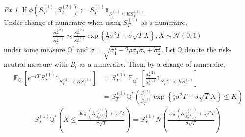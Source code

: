 \documentclass[10pt,landscape, a4paper]{article}
\theoremstyle{remark}
\newtheorem*{Ex}{Ex}
\newcommand{\E}{\operatorname{\mathbb{E}}}
\newcommand{\Q}{\mathbb{Q}}
\begin{document}
\begin{multicols*}{3}
\begin{Ex}
If $\phi (S^{(1)}_T, S^{(2)}_T) := S^{(1)}_T \mathds{1}_{S^{(1)}_T \leq KS^{(1)}_T}$,\\
Under change of numeraire when using $S^{(1)}_T$ as a numeraire, 
\begin{align*}
    \frac{S^{(2)}_T}{S^{(1)}_T} \sim \frac{S^{(2)}_T}{S^{(1)}_T} \exp \left\{\frac{1}{2}\sigma^2 T + \sigma \sqrt{T}X \right\}, X \sim \mathcal{N}(0, 1)
\end{align*}
under some measure $\Q^*$ and $\sigma = \sqrt{\sigma_1^2 - 2\rho \sigma_1 \sigma_2 + \sigma^2_2}$. Let $\Q$ denote the risk-neutral measure with $B_t$ as a numeraire. Then, by a change of numeraire,
\begin{align*}
    \E_{\Q} \left[e^{-rT}S^{(1)}_T \mathds{1}_{S^{(2)}_T < K S^{(1)}_T} \right] &= S^{(1)}_T \E_{\Q^*} \left[\frac{S^{(2)}_T}{S^{(1)}_T} \mathds{1}_{S^{(2)}_T < K S^{(1)}_T} \right]\\
    &=S^{(1)}_T \Q^* \left(\frac{S^{(2)}_T}{S^{(1)}_T} \exp \left\{\frac{1}{2}\sigma^2 T + \sigma \sqrt{T}X \right\} \leq K \right)
\end{align*}
\begin{align*}
    S^{(1)}_T \Q^* \left(X \leq \frac{\log \left(K \frac{S^{(1)}_T}{S^{(2)}_T} \right)+ \frac{1}{2}\sigma^2 T }{\sigma \sqrt{T}} \right)=S^{(1)}_T N \left(\frac{\log \left(K\frac{S^{(1)}_T}{S^{(2)}_T} \right) + \frac{1}{2}\sigma^2 T}{\sigma \sqrt{T}} \right)
\end{align*}
\end{Ex}

 
 
\end{multicols*}
\end{document}
